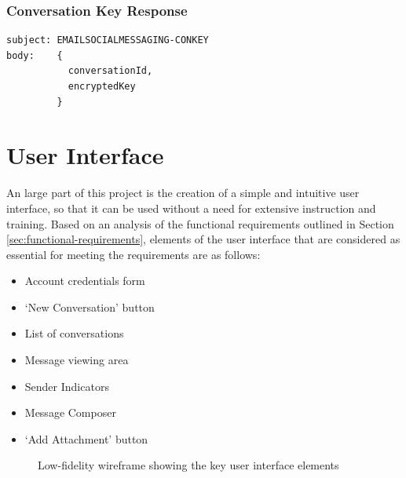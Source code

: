 \subsubsection{Conversation Key Response}
\begin{Verbatim}[fontsize=\small]
subject: EMAILSOCIALMESSAGING-CONKEY
body:    {
           conversationId,
           encryptedKey
         }
\end{Verbatim}

\section{User Interface}\label{sec:ui-design}

An large part of this project is the creation of a simple and intuitive user interface, so that it can be used without a need for extensive instruction and training. Based on an analysis of the functional requirements outlined in Section \ref{sec:functional-requirements}, elements of the user interface that are considered as essential for meeting the requirements are as follows:
\begin{itemize}
  \item Account credentials form
  \item `New Conversation' button
  \item List of conversations
  \item Message viewing area
  \item Sender Indicators
  \item Message Composer
  \item `Add Attachment' button
\end{itemize}

\begin{figure}[h!]
  \centering
  \caption{Low-fidelity wireframe showing the key user interface elements}
  \label{fig:ui-wireframes}
\end{figure}

